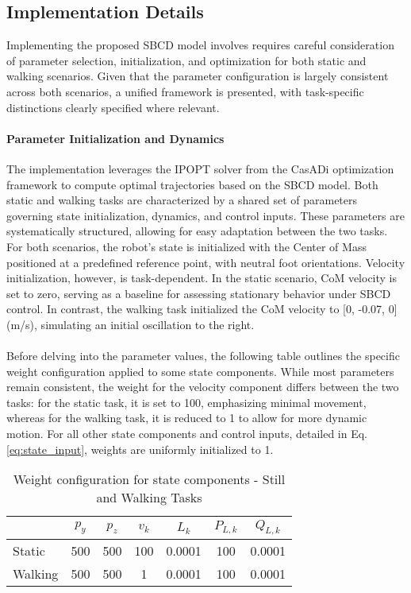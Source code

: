 \documentclass[main.tex]{subfiles}
\begin{document}
\begin{sloppypar}
\subsection{Implementation Details}
Implementing the proposed SBCD model involves requires careful consideration of parameter selection, initialization, and optimization for both static and walking scenarios. Given that the parameter configuration is largely consistent across both scenarios, a unified framework is presented, with task-specific distinctions clearly specified where relevant.
\paragraph{Parameter Initialization and Dynamics} The implementation leverages the IPOPT solver from the CasADi optimization framework to compute optimal trajectories based on the SBCD model. Both static and walking tasks are characterized by a shared set of parameters governing state initialization, dynamics, and control inputs. These parameters are systematically structured, allowing for easy adaptation between the two tasks. For both scenarios, the robot’s state is initialized with the Center of Mass positioned at a predefined reference point, with neutral foot orientations. Velocity initialization, however, is task-dependent. In the static scenario, CoM velocity is set to zero, serving as a baseline for assessing stationary behavior under SBCD control. In contrast, the walking task initialized the CoM velocity to [0, -0.07, 0]  (m/s), simulating an initial oscillation to the right. \\ 
\\
Before delving into the parameter values, the following table outlines the specific weight configuration applied to some state components. While most parameters remain consistent, the weight for the velocity component differs between the two tasks: for the static task, it is set to 100, emphasizing minimal movement, whereas for the walking task, it is reduced to 1 to allow for more dynamic motion. For all other state components and control inputs, detailed in Eq. \ref{eq:state_input}, weights are uniformly initialized to 1.
\begin{table}[h!]
    \centering
    \begin{tabular}{lcccccc}
    \toprule
    & $p_y$ & $p_z$ & $v_k$ & $L_k$ & $P_{L,k}$ & $Q_{L,k}$ \\
    \midrule
    Static & 500 & 500 & 100 & 0.0001 & 100 & 0.0001 \\
    Walking & 500 & 500 & 1 & 0.0001 & 100 & 0.0001 \\
    \bottomrule
    \end{tabular}
    \caption{Weight configuration for state components - Still and Walking Tasks}
\end{table}

\end{sloppypar}
\end{document}
